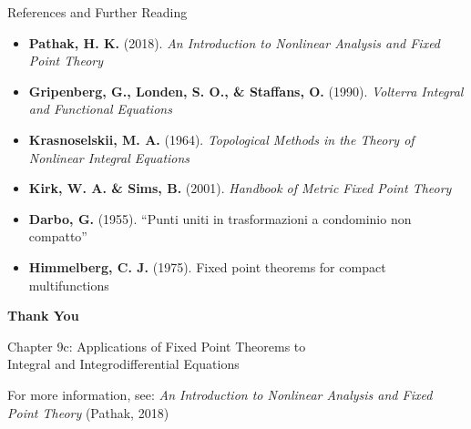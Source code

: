 \documentclass[aspectratio=169,10pt]{beamer}
\begin{document}
\begin{frame}[fragile]{References and Further Reading}
\begin{itemize}
    \item \textbf{Pathak, H. K.} (2018). \textit{An Introduction to Nonlinear Analysis and Fixed Point Theory}

    \item \textbf{Gripenberg, G., Londen, S. O., \& Staffans, O.} (1990). \textit{Volterra Integral and Functional Equations}

    \item \textbf{Krasnoselskii, M. A.} (1964). \textit{Topological Methods in the Theory of Nonlinear Integral Equations}

    \item \textbf{Kirk, W. A. \& Sims, B.} (2001). \textit{Handbook of Metric Fixed Point Theory}

    \item \textbf{Darbo, G.} (1955). ``Punti uniti in trasformazioni a condominio non compatto''

    \item \textbf{Himmelberg, C. J.} (1975). Fixed point theorems for compact multifunctions
\end{itemize}
\end{frame}

\begin{frame}[plain]
\begin{center}
\Huge \textbf{Thank You}

\vspace{2em}

\Large Chapter 9c: Applications of Fixed Point Theorems to \\
Integral and Integrodifferential Equations

\vspace{2em}

\normalsize For more information, see:
\textit{An Introduction to Nonlinear Analysis and Fixed Point Theory} (Pathak, 2018)
\end{center}
\end{frame}
\end{document}
